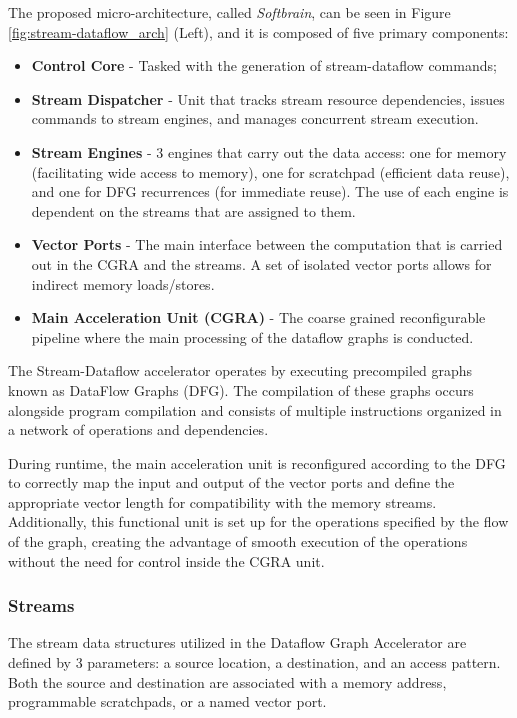 The proposed micro-architecture, called \textit{Softbrain}, can be seen in Figure \ref{fig:stream-dataflow_arch} (Left), and it is composed of five primary components:

\begin{itemize}
    \item \textbf{Control Core} - Tasked with the generation of stream-dataflow commands;
    \item \textbf{Stream Dispatcher} - Unit that tracks stream resource dependencies, issues commands to stream engines, and manages concurrent stream execution.
    \item \textbf{Stream Engines} - 3 engines that carry out the data access: one for memory (facilitating wide access to memory), one for scratchpad (efficient data reuse), and one for DFG recurrences (for immediate reuse). The use of each engine is dependent on the streams that are assigned to them.
    \item \textbf{Vector Ports} - The main interface between the computation that is carried out in the CGRA and the streams. A set of isolated vector ports allows for indirect memory loads/stores.
    \item \textbf{Main Acceleration Unit (CGRA)} - The coarse grained reconfigurable pipeline where the main processing of the dataflow graphs is conducted. 
\end{itemize}

The Stream-Dataflow accelerator operates by executing precompiled graphs known as DataFlow Graphs (DFG). The compilation of these graphs occurs alongside program compilation and consists of multiple instructions organized in a network of operations and dependencies. 


During runtime, the main acceleration unit is reconfigured according to the DFG to correctly map the input and output of the vector ports and define the appropriate vector length for compatibility with the memory streams. Additionally, this functional unit is set up for the operations specified by the flow of the graph, creating the advantage of smooth execution of the operations without the need for control inside the CGRA unit.


\subsubsection{Streams}

The stream data structures utilized in the Dataflow Graph Accelerator are defined by 3 parameters: a source location, a destination, and an access pattern. Both the source and destination are associated with a memory address, programmable scratchpads, or a named vector port.

